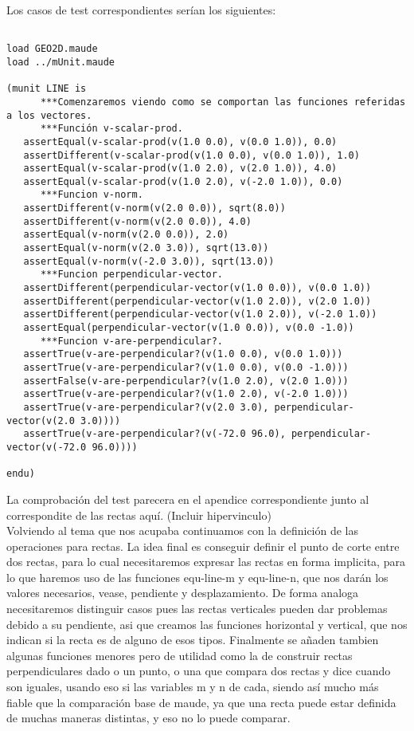 Los casos de test correspondientes ser\'ian los siguientes: \par

\begin{verbatim}

load GEO2D.maude
load ../mUnit.maude

(munit LINE is
      ***Comenzaremos viendo como se comportan las funciones referidas a los vectores.
      ***Función v-scalar-prod.
   assertEqual(v-scalar-prod(v(1.0 0.0), v(0.0 1.0)), 0.0)
   assertDifferent(v-scalar-prod(v(1.0 0.0), v(0.0 1.0)), 1.0)
   assertEqual(v-scalar-prod(v(1.0 2.0), v(2.0 1.0)), 4.0)
   assertEqual(v-scalar-prod(v(1.0 2.0), v(-2.0 1.0)), 0.0)		
      ***Funcion v-norm.
   assertDifferent(v-norm(v(2.0 0.0)), sqrt(8.0))
   assertDifferent(v-norm(v(2.0 0.0)), 4.0)
   assertEqual(v-norm(v(2.0 0.0)), 2.0)
   assertEqual(v-norm(v(2.0 3.0)), sqrt(13.0))
   assertEqual(v-norm(v(-2.0 3.0)), sqrt(13.0))
      ***Funcion perpendicular-vector.
   assertDifferent(perpendicular-vector(v(1.0 0.0)), v(0.0 1.0))
   assertDifferent(perpendicular-vector(v(1.0 2.0)), v(2.0 1.0))
   assertDifferent(perpendicular-vector(v(1.0 2.0)), v(-2.0 1.0))
   assertEqual(perpendicular-vector(v(1.0 0.0)), v(0.0 -1.0))
      ***Funcion v-are-perpendicular?.
   assertTrue(v-are-perpendicular?(v(1.0 0.0), v(0.0 1.0)))
   assertTrue(v-are-perpendicular?(v(1.0 0.0), v(0.0 -1.0)))
   assertFalse(v-are-perpendicular?(v(1.0 2.0), v(2.0 1.0)))
   assertTrue(v-are-perpendicular?(v(1.0 2.0), v(-2.0 1.0)))
   assertTrue(v-are-perpendicular?(v(2.0 3.0), perpendicular-vector(v(2.0 3.0))))
   assertTrue(v-are-perpendicular?(v(-72.0 96.0), perpendicular-vector(v(-72.0 96.0))))

endu)
\end{verbatim}

La comprobaci\'on del test parecera en el apendice correspondiente junto al correspondite de las rectas aqu\'i. (Incluir hipervinculo) \\

Volviendo al tema que nos acupaba continuamos con la definici\'on de las operaciones para rectas. La idea final es conseguir definir el punto de corte entre dos rectas, para lo cual necesitaremos expresar las rectas en forma implicita, para lo que haremos uso de las funciones equ-line-m y equ-line-n, que nos dar\'an los valores necesarios, vease, pendiente y desplazamiento. De forma analoga necesitaremos distinguir casos pues las rectas verticales pueden dar problemas debido a su pendiente, asi que creamos las funciones horizontal y vertical, que nos indican si la recta es de alguno de esos tipos. Finalmente se añaden tambien algunas funciones menores pero de utilidad como la de construir rectas perpendiculares dado o un punto, o una que compara dos rectas y dice cuando son iguales, usando eso si las variables m y n de cada, siendo as\'i mucho m\'as fiable que la comparaci\'on base de maude, ya que una recta puede estar definida de muchas maneras distintas, y eso no lo puede comparar. \par

